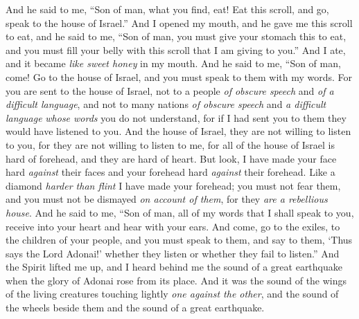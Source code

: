 \begin{biblechapter} %
\verse And he said to me, “Son of man, what you find, eat! Eat this scroll, and go, speak to the house of Israel.”
\verse And I opened my mouth, and he gave me this scroll to eat,
\verse and he said to me, “Son of man, you must give your stomach this to eat, and you must fill your belly with this scroll that I am giving to you.” And I ate, and it became \textit{like sweet honey} in my mouth.
\verse And he said to me, “Son of man, come! Go to the house of Israel, and you must speak to them with my words.
\verse For you are sent to the house of Israel, not to a people \textit{of obscure speech} and \textit{of a difficult language},
\verse and not to many nations \textit{of obscure speech} and \textit{a difficult language} \textit{whose words} you do not understand, for if I had sent you to them they would have listened to you.
\verse And the house of Israel, they are not willing to listen to you, for they are not willing to listen to me, for all of the house of Israel is hard of forehead, and they are hard of heart.
\verse But look, I have made your face hard \textit{against} their faces and your forehead hard \textit{against} their forehead.
\verse Like a diamond \textit{harder than flint} I have made your forehead; you must not fear them, and you must not be dismayed \textit{on account of them}, for they \textit{are a rebellious house}.
\verse And he said to me, “Son of man, all of my words that I shall speak to you, receive into your heart and hear with your ears.
\verse And come, go to the exiles, to the children of your people, and you must speak to them, and say to them, ‘Thus says the Lord Adonai!’ whether they listen or whether they fail to listen.”
\verse And the Spirit lifted me up, and I heard behind me the sound of a great earthquake when the glory of Adonai rose from its place.
\verse And it was the sound of the wings of the living creatures touching lightly \textit{one against the other}, and the sound of the wheels beside them and the sound of a great earthquake.

\end{biblechapter}

